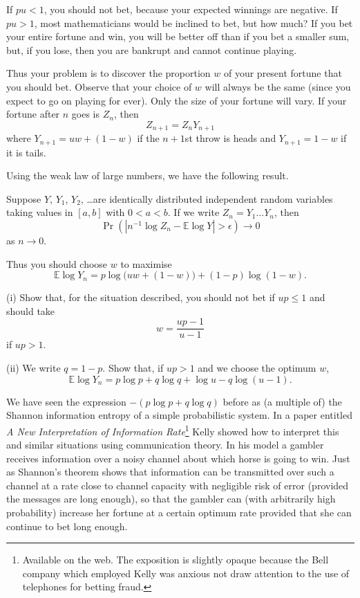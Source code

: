If $pu<1$, you should not bet, because your expected winnings are
negative. If $pu>1$, most mathematicians would
be inclined to bet, but how much? If you bet your entire fortune
and win, you will be better off than if you bet
a smaller sum, but, if you lose, then you are bankrupt
and cannot continue playing. 

Thus your problem is to discover
the proportion $w$ of your present fortune
that you should bet. Observe that your choice of $w$ 
will always be the same (since 
you expect to go on playing for ever). Only the size of your 
fortune will vary. If your fortune after $n$ goes
is $Z_{n}$, then
\[Z_{n+1}=Z_{n}Y_{n+1}\]
where $Y_{n+1}=uw+(1-w)$ if the $n+1$st throw is heads
and $Y_{n+1}=1-w$ if it is tails. 

Using the weak law of large numbers, we have the following 
result.
\begin{lemma} Suppose $Y$, $Y_{1}$, $Y_{2}$, \dots are identically
distributed 
independent random variables taking values in $[a,b]$ with
$0<a<b$. If we write $Z_{n}=Y_{1}\dots Y_{n}$, then
\[\Pr(|n^{-1}\log Z_{n}-{\mathbb E}\log Y|>\epsilon)\rightarrow 0\]
as $n\rightarrow 0$.
\end{lemma}   

Thus you should choose $w$ to maximise 
\[{\mathbb E}\log Y_{n}=p\log\big(uw+(1-w)\big)+(1-p)\log(1-w).\]
\begin{exercise}\label{E;fast Kelly}  
(i) Show that, for the situation described,
you should not bet if $up\leq 1$ and should take
\[w=\frac{up-1}{u-1}\]
if $up>1$. 

(ii) We write $q=1-p$. Show that, if $up>1$ and we choose 
the optimum $w$,
\[{\mathbb E}\log Y_{n}=p\log p+q\log q+\log u-q\log(u-1).\]
\end{exercise}

We have seen the expression $-(p\log p+q\log q)$ before
as (a multiple of)
the Shannon information entropy of a simple probabilistic system.
In a paper entitled 
\emph{A New Interpretation of Information Rate}\footnote{Available
on the web. The exposition is slightly opaque because
the Bell company which employed Kelly was anxious
not draw attention to the use of telephones for
betting fraud.}
Kelly  showed how to interpret this and similar
situations using communication theory. In his model
a gambler receives information over a noisy channel
about which horse is going to win. Just as Shannon's theorem
shows that information can be transmitted over
such a channel at a rate close to channel capacity
with negligible risk of error (provided the
messages are long enough), so that the gambler can 
(with arbitrarily high probability)
increase her fortune at a certain optimum rate
provided that she can continue to bet long enough.

